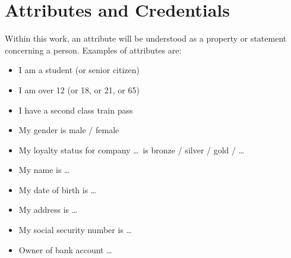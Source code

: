 


\section{Attributes and Credentials}

Within this work, an attribute will be understood as a property or statement
concerning a person. Examples of attributes are:
\begin{multicols}{2}
\begin{itemize}
  \item I am a student (or senior citizen)
  \item I am over 12 (or 18, or 21, or 65)
  \item I have a second class train pass
  \item My gender is male / female
  \item My loyalty status for company \dots\ is bronze / silver / gold / \dots
  \item My name is \dots
  \item My date of birth is \dots
  \item My address is \dots
  \item My social security number is \dots
  \item Owner of bank account \dots
\end{itemize}
\end{multicols}

